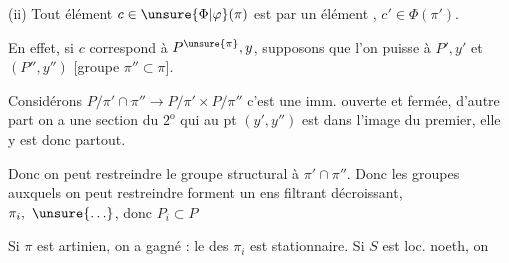 
(ii) Tout élément $c\in\unsure{\Phi|\varphi}(\pi)$ est  par
un élément , $c'\in\Phi(\pi')$.


En effet, si $c$ correspond à $P^{\unsure{\pi}},y$,
supposons que l'on puisse  à $P',y'$  
et $(P'',y'')$ [groupe $\pi''\subset\pi$].

Considérons $P/{\pi'\cap\pi''}\to P/\pi'\times P/\pi''$
c'est une imm. ouverte et fermée, d'autre
part on a une section du $2^{\mathrm{o}}$ 
qui  au pt $(y',y'')$ est dans l'image
du premier, elle y est donc partout.

Donc on peut restreindre le groupe structural
à $\pi'\cap\pi''$. Donc les groupes auxquels
on peut restreindre forment un ens
filtrant décroissant, $\pi_i,\ \unsure{\ldots}$, donc $P_i\subset P$

Si  $\pi$ est artinien, on a gagné : le  des $\pi_i$ est
stationnaire. Si $S$ est loc. noeth, on
